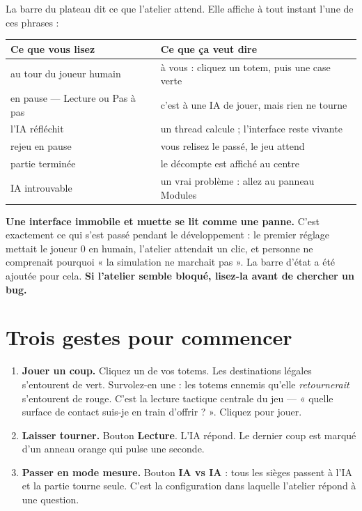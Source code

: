 La barre du plateau dit ce que l'atelier attend. Elle affiche à tout instant
l'une de ces phrases :

\begin{center}
\begin{tabular}{@{}p{6.6cm}p{7.2cm}@{}}
\toprule
\textbf{Ce que vous lisez} & \textbf{Ce que ça veut dire} \\
\midrule
au tour du joueur humain & à vous : cliquez un totem, puis une case verte \\
en pause — Lecture ou Pas à pas & c'est à une IA de jouer, mais rien ne tourne \\
l'IA réfléchit & un thread calcule ; l'interface reste vivante \\
rejeu en pause & vous relisez le passé, le jeu attend \\
partie terminée & le décompte est affiché au centre \\
IA introuvable & un vrai problème : allez au panneau Modules \\
\bottomrule
\end{tabular}
\end{center}

\begin{nkretenir}
\textbf{Une interface immobile et muette se lit comme une panne.} C'est
exactement ce qui s'est passé pendant le développement : le premier réglage
mettait le joueur 0 en humain, l'atelier attendait un clic, et personne ne
comprenait pourquoi « la simulation ne marchait pas ». La barre d'état a été
ajoutée pour cela. \textbf{Si l'atelier semble bloqué, lisez-la avant de
chercher un bug.}
\end{nkretenir}

\section{Trois gestes pour commencer}

\begin{enumerate}
  \item \textbf{Jouer un coup.} Cliquez un de vos totems. Les destinations
        légales s'entourent de vert. Survolez-en une : les totems ennemis
        qu'elle \emph{retournerait} s'entourent de rouge. C'est la lecture
        tactique centrale du jeu — « quelle surface de contact suis-je en train
        d'offrir ? ». Cliquez pour jouer.
  \item \textbf{Laisser tourner.} Bouton \textbf{Lecture}. L'IA répond. Le
        dernier coup est marqué d'un anneau orange qui pulse une seconde.
  \item \textbf{Passer en mode mesure.} Bouton \textbf{IA vs IA} : tous les
        sièges passent à l'IA et la partie tourne seule. C'est la configuration
        dans laquelle l'atelier répond à une question.
\end{enumerate}


